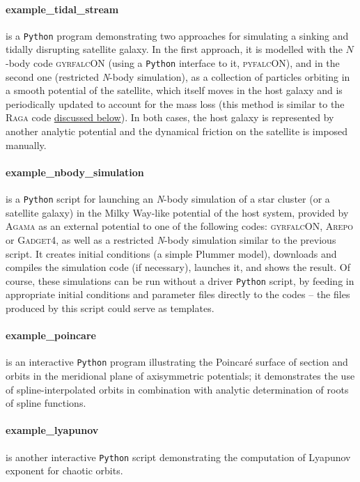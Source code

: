 \documentclass[12pt]{article}
\newcommand{\Agama}{\textsc{Agama}\xspace}
\newcommand{\Nbody}{\textsl{N}-body\xspace}
\newcommand{\Python}{\texttt{Python}\xspace}
\let\oldparagraph\paragraph
\renewcommand{\paragraph}[1]{\vspace{-2mm}\oldparagraph{#1}}
\begin{document}
\paragraph{example_tidal_stream} is a \Python program demonstrating two approaches for simulating a sinking and tidally disrupting satellite galaxy. In the first approach, it is modelled with the $N$-body code \textsc{gyrfalcON} (using a \Python interface to it, \textsc{pyfalcON}), and in the second one (restricted \Nbody simulation), as a collection of particles orbiting in a smooth potential of the satellite, which itself moves in the host galaxy and is periodically updated to account for the mass loss (this method is similar to the \textsc{Raga} code \hyperref[sec:raga]{discussed below}). In both cases, the host galaxy is represented by another analytic potential and the dynamical friction on the satellite is imposed manually.

\paragraph{example_nbody_simulation} is a \Python script for launching an \Nbody simulation of a star cluster (or a satellite galaxy) in the Milky Way-like potential of the host system, provided by \Agama as an external potential to one of the following codes: \textsc{gyrfalcON}, \textsc{Arepo} or \textsc{Gadget4}, as well as a restricted \Nbody simulation similar to the previous script. It creates initial conditions (a simple Plummer model), downloads and compiles the simulation code (if necessary), launches it, and shows the result. Of course, these simulations can be run without a driver \Python script, by feeding in appropriate initial conditions and parameter files directly to the codes -- the files produced by this script could serve as templates.

\paragraph{example_poincare} is an interactive \Python program illustrating the Poincar\'e surface of section and orbits in the meridional plane of axisymmetric potentials; it demonstrates the use of spline-interpolated orbits in combination with analytic determination of roots of spline functions.

\paragraph{example_lyapunov} is another interactive \Python script demonstrating the computation of Lyapunov exponent for chaotic orbits.
\end{document}
